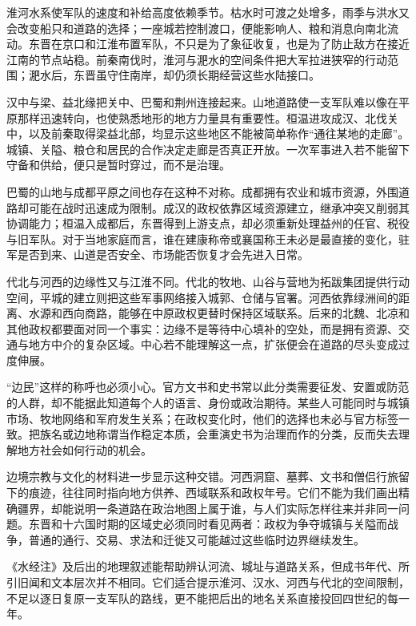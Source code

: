 淮河水系使军队的速度和补给高度依赖季节。枯水时可渡之处增多，雨季与洪水又会改变船只和道路的选择；一座城若控制渡口，便能影响人、粮和消息向南北流动。东晋在京口和江淮布置军队，不只是为了象征收复，也是为了防止敌方在接近江南的节点站稳。前秦南伐时，淮河与淝水的空间条件把大军拉进狭窄的行动范围；淝水后，东晋虽守住南岸，却仍须长期经营这些水陆接口。

汉中与梁、益北缘把关中、巴蜀和荆州连接起来。山地道路使一支军队难以像在平原那样迅速转向，也使熟悉地形的地方力量具有重要性。桓温进攻成汉、北伐关中，以及前秦取得梁益北部，均显示这些地区不能被简单称作“通往某地的走廊”。城镇、关隘、粮仓和居民的合作决定走廊是否真正开放。一次军事进入若不能留下守备和供给，便只是暂时穿过，而不是治理。

巴蜀的山地与成都平原之间也存在这种不对称。成都拥有农业和城市资源，外围道路却可能在战时迅速成为限制。成汉的政权依靠区域资源建立，继承冲突又削弱其协调能力；桓温入成都后，东晋得到上游支点，却必须重新处理益州的任官、税役与旧军队。对于当地家庭而言，谁在建康称帝或襄国称王未必是最直接的变化，驻军是否到来、山道是否安全、市场能否恢复才会先进入日常。

代北与河西的边缘性又与江淮不同。代北的牧地、山谷与营地为拓跋集团提供行动空间，平城的建立则把这些军事网络接入城郭、仓储与官署。河西依靠绿洲间的距离、水源和西向商路，能够在中原政权更替时保持区域联系。后来的北魏、北凉和其他政权都要面对同一个事实：边缘不是等待中心填补的空处，而是拥有资源、交通与地方中介的复杂区域。中心若不能理解这一点，扩张便会在道路的尽头变成过度伸展。

“边民”这样的称呼也必须小心。官方文书和史书常以此分类需要征发、安置或防范的人群，却不能据此知道每个人的语言、身份或政治期待。某些人可能同时与城镇市场、牧地网络和军府发生关系；在政权变化时，他们的选择也未必与官方标签一致。把族名或边地称谓当作稳定本质，会重演史书为治理而作的分类，反而失去理解地方社会如何行动的机会。

边境宗教与文化的材料进一步显示这种交错。河西洞窟、墓葬、文书和僧侣行旅留下的痕迹，往往同时指向地方供养、西域联系和政权年号。它们不能为我们画出精确疆界，却能说明一条道路在政治地图上属于谁，与人们实际怎样往来并非同一问题。东晋和十六国时期的区域史必须同时看见两者：政权为争夺城镇与关隘而战争，普通的通行、交易、求法和迁徙又可能越过这些临时边界继续发生。

\begin{textwindow}[道路材料不是精确行军图]
《水经注》及后出的地理叙述能帮助辨认河流、城址与道路关系，但成书年代、所引旧闻和文本层次并不相同。它们适合提示淮河、汉水、河西与代北的空间限制，不足以逐日复原一支军队的路线，更不能把后出的地名关系直接投回四世纪的每一年。
\end{textwindow}

